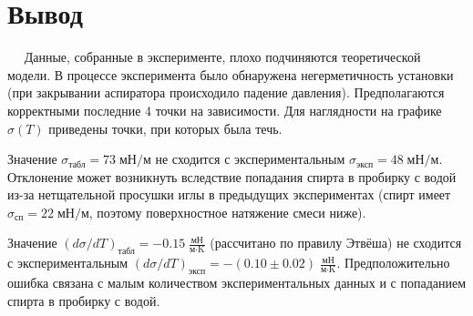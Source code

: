 \documentclass[12pt,a4paper]{article}
\begin{document}
	\section*{Вывод}
	
		$\quad$ Данные, собранные в эксперименте, плохо подчиняются теоретической модели. В процессе эксперимента было обнаружена негерметичность установки (при закрывании аспиратора происходило падение давления). Предполагаются корректными последние 4 точки на зависимости. Для наглядности на графике $\sigma (T)$ приведены точки, при которых была течь.
		
		Значение $\sigma_{\text{табл}} = 73 \; \text{мН}/\text{м}$ не сходится с экспериментальным $\sigma_{\text{эксп}} = 48 \; \text{мН}/\text{м}$. Отклонение может возникнуть вследствие попадания спирта в пробирку с водой из-за нетщательной просушки иглы в предыдущих экспериментах (спирт имеет $\sigma_{\text{сп}} = 22 \; \text{мН}/\text{м}$, поэтому поверхностное натяжение смеси ниже).
		
		Значение $(d\sigma/dT)_{\text{табл}} = - 0.15 \; \frac{\text{мН}}{\text{м} \cdot \text{K}}$ (рассчитано по правилу Этвёша) не сходится с экспериментальным $(d\sigma/dT)_{\text{эксп}} = - (0.10 \pm 0.02) \; \frac{\text{мН}}{\text{м} \cdot \text{K}}$. Предположительно ошибка связана с малым количеством экспериментальных данных и с попаданием спирта в пробирку с водой.
	
\end{document}
